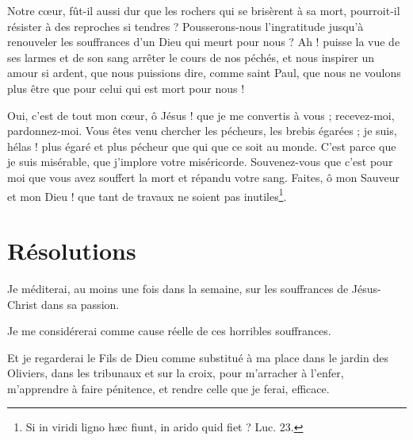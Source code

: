 \documentclass[instructions.tex]{subfiles}
\begin{document}
Notre cœur, fût-il aussi dur que les rochers qui se brisèrent à sa mort, pourroit-il résister à des reproches si tendres ? Pousserons-nous l'ingratitude jusqu'à renouveler les souffrances d'un Dieu qui meurt pour nous ? Ah ! puisse la vue de ses larmes et de son sang arrêter le cours de nos péchés, et nous inspirer un amour si ardent, que nous puissions dire, comme saint Paul, que nous ne voulons plus être que pour celui qui est mort pour nous !

Oui, c'est de tout mon cœur, ô Jésus ! que je me convertis à vous ; recevez-moi, pardonnez-moi. Vous êtes venu chercher les pécheurs, les brebis égarées ; je suis, hélas ! plus égaré et plus pécheur que qui que ce soit au monde. C'est parce que je suis misérable, que j'implore votre miséricorde. Souvenez-vous que c'est pour moi que vous avez souffert la mort et répandu votre sang. Faites, ô mon Sauveur et mon Dieu ! que tant de travaux ne soient pas inutiles\footnote{Si in viridi ligno hæc fiunt, in arido quid fiet ? Luc. 23.}.

\section{Résolutions}

\primo Je méditerai, au moins une fois dans la semaine, sur les souffrances de Jésus-Christ dans sa passion.

\secundo Je me considérerai comme cause réelle de ces horribles souffrances.

\tertio Et je regarderai le Fils de Dieu comme substitué à ma place dans le jardin des Oliviers, dans les tribunaux et sur la croix, pour m'arracher à l'enfer, m'apprendre à faire pénitence, et rendre celle que je ferai, efficace. 

\end{document}
